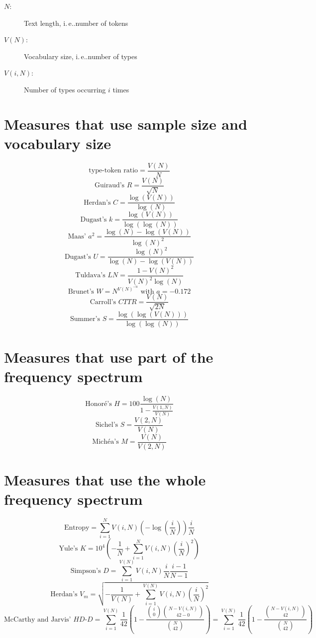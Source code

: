 \documentclass[11pt]{scrartcl}
\title{}
\author{}
\date{\today}
\makeatletter
\newcommand{\ie}{i.\,e\@ifnextchar.{}{.\@\xspace}}
\makeatother
\begin{document}
\maketitle

\begin{description}
\item[$N$:] Text length, \ie number of tokens
\item[$V(N)$:] Vocabulary size, \ie number of types
\item[$V(i, N)$:] Number of types occurring $i$ times
\end{description}

\section{Measures that use sample size and vocabulary size}

\[\text{type-token ratio} = \frac{V(N)}{N}\]
\[\text{Guiraud's } R = \frac{V(N)}{\sqrt{N}}\]
\[\text{Herdan's } C = \frac{\log(V(N))}{\log(N)}\]
\[\text{Dugast's } k = \frac{\log(V(N))}{\log(\log(N))}\]
\[\text{Maas' } a^2 = \frac{\log(N) - \log(V(N))}{\log(N)^2}\]
\[\text{Dugast's } U = \frac{\log(N)^2}{\log(N) - \log(V(N))}\]
\[\text{Tuldava's } \textit{LN} = \frac{1 - V(N)^2}{V(N)^2\log(N)}\]
\[\text{Brunet's } W = N^{V(N)^{-a}} \text{ with } a = -0.172\]
\[\text{Carroll's } \textit{CTTR} = \frac{V(N)}{\sqrt{2 N}}\]
\[\text{Summer's } S = \frac{\log(\log(V(N)))}{\log(\log(N))}\]

\section{Measures that use part of the frequency spectrum}

\[\text{Honoré's } H = 100 \frac{\log(N)}{1 - \frac{V(1, N)}{V(N)}}\]
\[\text{Sichel's } S = \frac{V(2, N)}{V(N)}\]
\[\text{Michéa's } M = \frac{V(N)}{V(2, N)}\]

\section{Measures that use the whole frequency spectrum}

\[\text{Entropy} = \sum_{i=1}^N V(i, N)\left(-\log(\frac{i}{N})\right)\frac{i}{N}\]
\[\text{Yule's } K = 10^4 \left(-\frac{1}{N} + \sum_{i=1}^N V(i, N) \left( \frac{i}{N}\right)^2 \right)\]
\[\text{Simpson's } D = \sum_{i=1}^{V(N)} V(i, N) \frac{i}{N} \frac{i - 1}{N - 1}\]
\[\text{Herdan's } V_m = \sqrt{-\frac{1}{V(N)} + \sum_{i=1}^{V(N)} V(i, N) \left(\frac{i}{N}\right)^2}\]
\[\text{McCarthy and Jarvis' } \textit{HD-D} = \sum_{i=1}^{V(N)} \frac{1}{42} \left(1 - \frac{\binom{i}{0} \binom{N - V(i, N)}{42 - 0}}{\binom{N}{42}}\right) = \sum_{i=1}^{V(N)} \frac{1}{42} \left(1 - \frac{\binom{N - V(i, N)}{42}}{\binom{N}{42}}\right)\]

\end{document}
